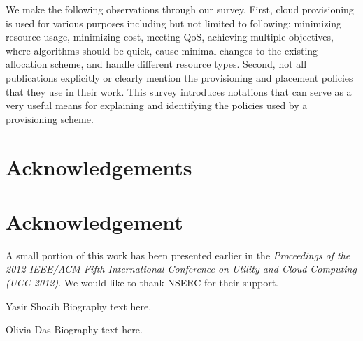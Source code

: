 \documentclass[10pt,journal,cspaper,compsoc]{IEEEtran}
\begin{document}
We make the following observations through our survey. First, cloud provisioning is used for various purposes including but not limited to following: minimizing resource usage, minimizing cost, meeting QoS, achieving multiple objectives, where algorithms should be quick, cause minimal changes to the existing allocation scheme, and handle different resource types. Second, not all publications explicitly or clearly mention the provisioning and placement policies that they use in their work. This survey introduces notations that can serve as a very useful means for explaining and identifying the policies used by a provisioning scheme.













\ifCLASSOPTIONcompsoc
\section*{Acknowledgements}
\else
\section*{Acknowledgement}
\fi


A small portion of this work has been presented earlier in the \emph{Proceedings of the 2012 IEEE/ACM Fifth International Conference on Utility and Cloud Computing (UCC 2012)}. We would like to thank NSERC for their support.



\ifCLASSOPTIONcaptionsoff
  \newpage
\fi












\begin{IEEEbiography}{Yasir Shoaib}
Biography text here.
\end{IEEEbiography}

\begin{IEEEbiography}{Olivia Das}
Biography text here.
\end{IEEEbiography}
\end{document}
